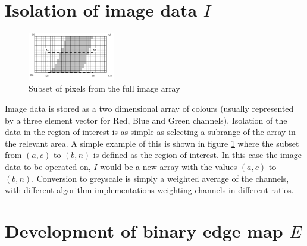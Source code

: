 \documentclass{article}
\begin{document}
	\section{Isolation of image data \textit{$I$}}
	\setlength{\intextsep}{0pt}%
	\begin{figure}
		\includegraphics[width=0.34\textwidth]{pixelSubset}
		\caption{Subset of pixels from the full image array}
		\label{pixelSubset}
	\end{figure}
	
	Image data is stored as a two dimensional array of colours (usually represented by a three element vector for Red, Blue and Green channels). Isolation of the data in the region of interest is as simple as selecting a subrange of the array in the relevant area. A simple example of this is shown in figure \ref{pixelSubset} where the subset from $(a,c)$ to $(b,n)$ is defined as the region of interest. In this case the image data to be operated on, \textit{$I$} would be a new array with the values $(a,c)$ to $(b,n)$. Conversion to greyscale is simply a weighted average of the channels, with different algorithm implementations weighting channels in different ratios.
	



%	
	
	
	\section{Development of binary edge map \textit{$E$}}
	
\end{document}

